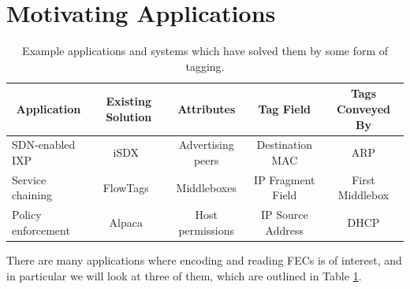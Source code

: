 

\section{Motivating Applications}\label{sec:motivation}
\begin{table}[t]
\begin{center}
    \begin{tabular}{|l|c|c|c|c|}
    \hline
    \multicolumn{1}{|c|}{\bf Application} & 
    \multicolumn{1}{c|}{\bf Existing Solution} & 
    \multicolumn{1}{c|}{\bf Attributes} & 
    \multicolumn{1}{c|}{\bf Tag Field} & 
    \multicolumn{1}{c|}{\bf Tags Conveyed By}\\ \hline
    SDN-enabled IXP & iSDX~\cite{isdx} & Advertising peers & Destination MAC & ARP \\ \hline
    Service chaining & FlowTags~\cite{flowtags} & Middleboxes & IP Fragment Field & First Middlebox \\ \hline
    Policy enforcement & Alpaca~\cite{alpaca} & Host permissions & IP Source Address & DHCP \\ \hline
    \end{tabular}
\end{center}
    \caption{Example applications and systems which have solved them by some form of tagging.} 
    \label{tab:applications}
\end{table}

There are many applications where encoding and reading FECs is of interest, and in particular we will look at three of them, which are outlined in Table \ref{tab:applications}.
 
